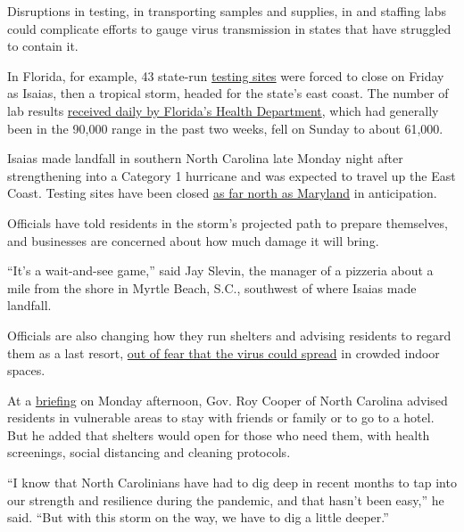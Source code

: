 Disruptions in testing, in transporting samples and supplies, in and
staffing labs could complicate efforts to gauge virus transmission in
states that have struggled to contain it.

In Florida, for example, 43 state-run
\href{https://floridadisaster.org/covid19/testing-sites/}{testing sites}
were forced to close on Friday as Isaias, then a tropical storm, headed
for the state's east coast. The number of lab results
\href{http://ww11.doh.state.fl.us/comm/_partners/covid19_report_archive/state_reports_latest.pdf}{received
daily by Florida's Health Department}, which had generally been in the
90,000 range in the past two weeks, fell on Sunday to about 61,000.

Isaias made landfall in southern North Carolina late Monday night after
strengthening into a Category 1 hurricane and was expected to travel up
the East Coast. Testing sites have been closed
\href{https://patch.com/maryland/baltimore/tropical-storm-isaias-closes-14-md-coronavirus-testing-sites}{as
far north as Maryland} in anticipation.

Officials have told residents in the storm's projected path to prepare
themselves, and businesses are concerned about how much damage it will
bring.

``It's a wait-and-see game,'' said Jay Slevin, the manager of a pizzeria
about a mile from the shore in Myrtle Beach, S.C., southwest of where
Isaias made landfall.

Officials are also changing how they run shelters and advising residents
to regard them as a last resort,
\href{https://www.nytimes3xbfgragh.onion/2020/07/26/us/virus-texas-storm.html}{out
of fear that the virus could spread} in crowded indoor spaces.

At a
\href{https://www.ncdps.gov/storm-update?fbclid=IwAR3gtINKPXqQdsJixuf1kwBKbAtEMz62wzyoDHlu7FDBN1HTarDlw8FlVwQ}{briefing}
on Monday afternoon, Gov. Roy Cooper of North Carolina advised residents
in vulnerable areas to stay with friends or family or to go to a hotel.
But he added that shelters would open for those who need them, with
health screenings, social distancing and cleaning protocols.

``I know that North Carolinians have had to dig deep in recent months to
tap into our strength and resilience during the pandemic, and that
hasn't been easy,'' he said. ``But with this storm on the way, we have
to dig a little deeper.''

\hypertarget{-5}{%
\subsection{}\label{-5}}

